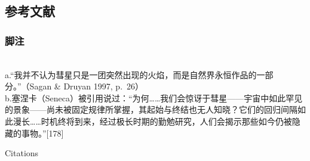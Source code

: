 \subsection{参考文献}
\subsubsection{脚注}\\
a.“我并不认为彗星只是一团突然出现的火焰，而是自然界永恒作品的一部分。”（Sagan \& Druyan 1997, p.~26）\\
b.塞涅卡（Seneca）被引用说过：“为何……我们会惊讶于彗星——宇宙中如此罕见的景象——尚未被固定规律所掌握，其起始与终结也无人知晓？它们的回归间隔如此漫长……时机终将到来，经过极长时期的勤勉研究，人们会揭示那些如今仍被隐藏的事物。”[178]

Citations

